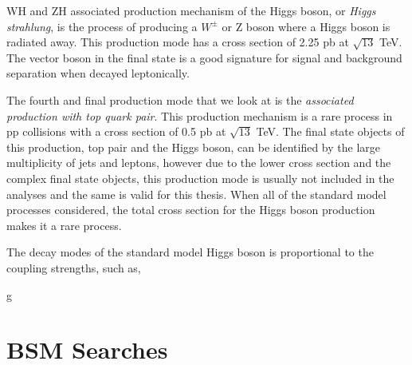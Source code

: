 WH and ZH associated production mechanism of the Higgs boson, or \emph{Higgs strahlung}, is the process of producing a $W^\pm$ or Z boson where a Higgs boson is radiated away. This production mode has a cross section of 2.25 pb at $\sqrt{13}$ TeV. The vector boson in the final state is a good signature for signal and background separation when decayed leptonically.

The fourth and final production mode that we look at is the \emph{associated production with top quark pair}. This production mechanism is a rare process in pp collisions with a cross section of 0.5 pb at $\sqrt{13}$ TeV. The final state objects of this production, top pair and the Higgs boson, can be identified by the large multiplicity of jets and leptons, however due to the lower cross section and the complex final state objects, this production mode is usually not included in the analyses and the same is valid for this thesis. When all of the standard model processes considered, the total cross section for the Higgs boson production makes it a rare process.

The decay modes of the standard model Higgs boson is proportional to the coupling strengths, such as,

\be
g
\ee



\section{BSM Searches}

